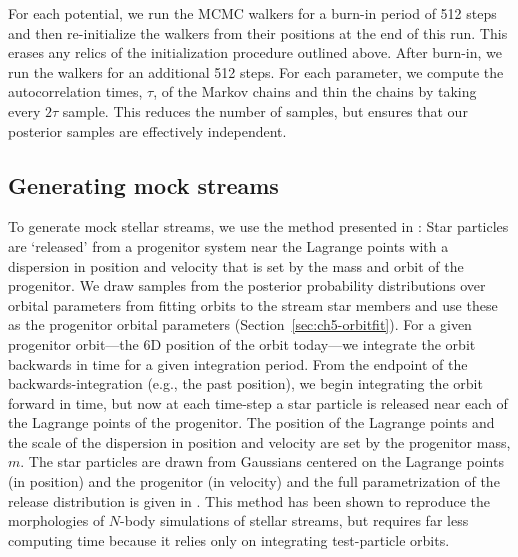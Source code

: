 For each potential, we run the MCMC walkers for a burn-in period of 512 steps
and then re-initialize the walkers from their positions at the end of this run.
This erases any relics of the initialization procedure outlined above. After
burn-in, we run the walkers for an additional 512 steps. For each parameter, we
compute the autocorrelation times, $\tau$, of the Markov chains and thin the
chains by taking every $2\tau$ sample. This reduces the number of samples, but
ensures that our posterior samples are effectively independent.

\subsection{Generating mock streams}\label{sec:ch5-mocks}

To generate mock stellar streams, we use the method presented in
\citet{fardal14}: Star particles are `released' from a progenitor system near
the Lagrange points with a dispersion in position and velocity that is set by
the mass and orbit of the progenitor. We draw samples from the posterior
probability distributions over orbital parameters from fitting orbits to the
stream star members and use these as the progenitor orbital parameters
(Section~\ref{sec:ch5-orbitfit}). For a given progenitor orbit---the 6D position of
the orbit today---we integrate the orbit backwards in time for a given
integration period. From the endpoint of the backwards-integration (e.g., the
past position), we begin integrating the orbit forward in time, but now at each
time-step a star particle is released near each of the Lagrange points of the
progenitor. The position of the Lagrange points and the scale of the dispersion
in position and velocity are set by the progenitor mass, $m$. The star particles
are drawn from Gaussians centered on the Lagrange points (in position) and the
progenitor (in velocity) and the full parametrization of the release
distribution is given in \cite{fardal14}. This method has been shown to
reproduce the morphologies of $N$-body simulations of stellar streams, but
requires far less computing time because it relies only on integrating
test-particle orbits.

